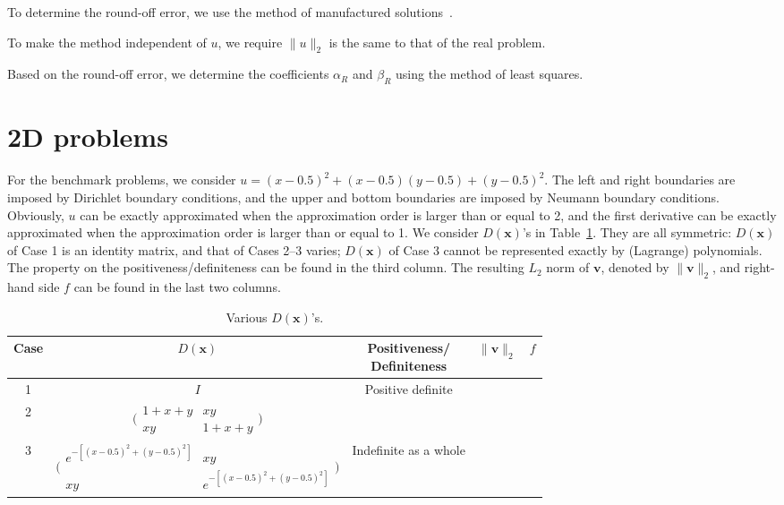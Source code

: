 \documentclass[review,3p]{elsarticle}
\begin{document}
To determine the round-off error, we use the method of manufactured solutions~\cite{salari2000code,roache2002code,gfrerer2018code}. 

To make the method independent of $u$, we require $\|u\|_2$ is the same to that of the real problem.

Based on the round-off error, we determine the coefficients $\alpha_{R}$ and $\beta_{R}$ using the method of least squares.

\newpage
\section{2D problems}  	\label{section_benchmark_problems}

For the benchmark problems, we consider $u=(x-0.5)^2+(x-0.5)(y-0.5)+(y-0.5)^2$. The left and right boundaries are imposed by Dirichlet boundary conditions, and the upper and bottom boundaries are imposed by Neumann boundary conditions. Obviously, $u$ can be exactly approximated when the approximation order is larger than or equal to 2, and the first derivative can be exactly approximated when the approximation order is larger than or equal to 1.
We consider $D(\mathbf{x})$'s in Table~\ref{expression_coefficient_d}. 
They are all symmetric: $D(\mathbf{x})$ of Case 1 is an identity matrix, and that of Cases 2--3 varies; $D(\mathbf{x})$ of Case 3 cannot be represented exactly by (Lagrange) polynomials.
The property on the positiveness/definiteness can be found in the third column. 
The resulting $L_2$ norm of $\mathbf{v}$, denoted by $\| \mathbf{v} \|_2$, and right-hand side $f$ can be found in the last two columns.

\begin{table}[!ht]
\centering
\caption{Various $D(\mathbf{x})$'s.}
\small
\label{expression_coefficient_d}
  \begin{tabular}{c|c|c|c|c}
    Case & $D(\mathbf{x})$ & \makecell{Positiveness/ \\Definiteness} & $\| \mathbf{v} \|_2$ & $f$ \\ \hline
    1 & $I$& \multirow{2}{*}{Positive definite} &  &  \\ \cline{1-2} \cline{4-5}
    2 & $\big(\begin{smallmatrix} 1+x+y & xy \\ xy & 1+x+y \end{smallmatrix} \big)$ &  &  &  \\ \cline{1-5}
    3 & $\big(\begin{smallmatrix} e^{-[(x-0.5)^2+(y-0.5)^2]} & xy \\ xy & e^{-[(x-0.5)^2+(y-0.5)^2]} \end{smallmatrix} \big)$ & Indefinite as a whole & &  \\ 
  \end{tabular}
\end{table}
\end{document}
